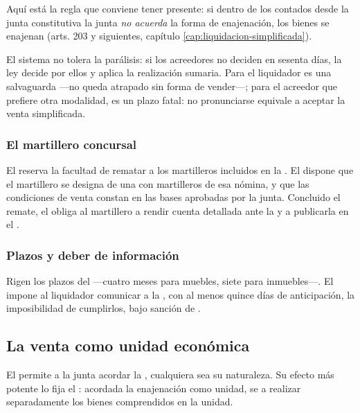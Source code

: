 Aquí está la regla que conviene tener presente: si dentro de los 
contados desde la junta constitutiva la junta \emph{no acuerda} la forma de enajenación, los
bienes se enajenan  (arts. 203 y siguientes, capítulo \ref{cap:liquidacion-simplificada}).

\begin{foco}
El sistema no tolera la parálisis: si los acreedores no deciden en sesenta días, la ley decide
por ellos y aplica la realización sumaria. Para el liquidador es una salvaguarda ---no queda
atrapado sin forma de vender---; para el acreedor que prefiere otra modalidad, es un plazo fatal:
no pronunciarse equivale a aceptar la venta simplificada.
\end{foco}

\subsubsection{El martillero concursal}

El  reserva la facultad de rematar a los martilleros incluidos en la
. El  dispone que el martillero se designa de
una  con martilleros de esa nómina, y que las
condiciones de venta constan en las bases aprobadas por la junta. Concluido el remate, el
 obliga al martillero a rendir cuenta detallada ante la \superir{}  y a publicarla en el \boletin{}.

\subsubsection{Plazos y deber de información}

Rigen los plazos del  ---cuatro meses para muebles, siete para inmuebles---. El
 impone al liquidador comunicar a la \superir{}, con al menos quince días de
anticipación, la imposibilidad de cumplirlos, bajo sanción de .

\subsection{La venta como unidad económica}

El  permite a la junta acordar la , cualquiera sea su naturaleza. Su efecto más potente lo fija el : acordada
la enajenación como unidad, se  a realizar separadamente los bienes comprendidos en la unidad.

